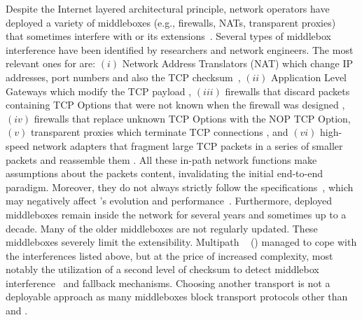Despite the Internet layered architectural principle, network operators have
deployed a variety of middleboxes (e.g., firewalls, NATs, transparent 
proxies)~\cite{mCloud} that sometimes interfere with \tcp or its 
extensions~\cite{medina2004measuring, honda2011still, edeline2019bottom}. 
Several types of middlebox interference have been identified by researchers and 
network engineers. The most relevant ones for \tcp are: $(i)$ Network Address 
Translators (NAT) which change IP addresses, port numbers and also the TCP 
checksum~\cite{wang2011untold}, $(ii)$ Application Level Gateways which 
modify the TCP payload \cite{rfc3207}, $(iii)$ firewalls that discard 
packets containing TCP Options that were not known when the firewall was 
designed \cite{edeline2020evaluating}, $(iv)$ firewalls that replace 
unknown TCP Options with the NOP TCP Option, $(v)$ transparent proxies which 
terminate TCP connections 
\cite{weaver2014here}, and $(vi)$ high-speed network adapters that fragment 
large TCP packets in a series of smaller packets and reassemble them 
\cite{honda2011still}. 
All these in-path network functions make assumptions about the \tcp packets content, invalidating the initial \tcp end-to-end paradigm. Moreover, they do not always strictly follow the \tcp specifications~\cite{honda2011still, hesmans2013tcp}, which may negatively affect \tcp's evolution and performance~\cite{edeline2020evaluating}. Furthermore, deployed middleboxes remain inside the network for several years and sometimes up to a decade. Many of the older middleboxes are not regularly updated. 
These middleboxes severely limit the \tcp extensibility. Multipath 
\tcp~\cite{rfc8684,raiciu2012hard} (\mptcp) managed to cope with the 
interferences listed above, but at the price of increased complexity, most 
notably the utilization of a second level of checksum to detect middlebox 
interference~\cite{raiciu2012hard,hesmans2013tcp} and fallback mechanisms. 
Choosing another transport is not a deployable approach as many middleboxes 
block transport protocols other than \tcp and \udp \cite{barik2020usability}.


